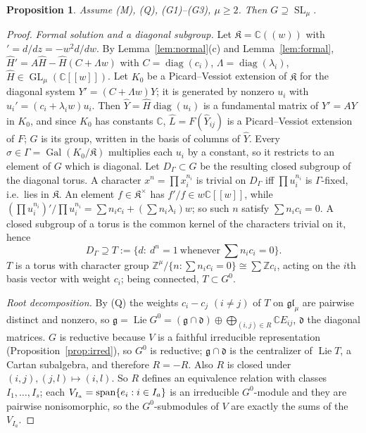 \documentclass[11pt]{article}
\numberwithin{equation}{section}
\newtheorem{proposition}[theorem]{Proposition}
\theoremstyle{definition}
\theoremstyle{remark}
\newcommand{\C}{\mathbb C}\newcommand{\Q}{\mathbb Q}\newcommand{\R}{\mathbb R}\newcommand{\Z}{\mathbb Z}
\newcommand{\SL}{\operatorname{SL}}\newcommand{\GL}{\operatorname{GL}}\newcommand{\PGL}{\operatorname{PGL}}
\newcommand{\Lie}{\operatorname{Lie}}\newcommand{\Gal}{\operatorname{Gal}}\newcommand{\wt}{\operatorname{wt}}
\begin{document}
\begin{proposition}\label{prop:SL}
Assume \textup{(M)}, \textup{(Q)}, \textup{(G1)--(G3)}, $\mu\ge2$. Then
$G\supseteq\SL_\mu$.
\end{proposition}
\begin{proof}
\emph{Formal solution and a diagonal subgroup.} Let $\mathfrak K=\C((w))$ with
$'=d/dz=-w^2d/dw$. By Lemma~\ref{lem:normal}(c) and Lemma~\ref{lem:formal},
$\widehat H'=A\widehat H-\widehat H(C+\Lambda w)$ with
$C=\operatorname{diag}(c_i)$, $\Lambda=\operatorname{diag}(\lambda_i)$,
$\widehat H\in\GL_\mu(\C[[w]])$. Let $K_0$ be a Picard--Vessiot extension of
$\mathfrak K$ for the diagonal system $Y'=(C+\Lambda w)Y$; it is generated by
nonzero $u_i$ with $u_i'=(c_i+\lambda_iw)u_i$. Then
$\widehat Y=\widehat H\operatorname{diag}(u_i)$ is a fundamental matrix of
$Y'=AY$ in $K_0$, and since $K_0$ has constants $\C$,
$\widehat L=F(\widehat Y_{ij})$ is a Picard--Vessiot extension of $F$; $G$ is its
group, written in the basis of columns of $\widehat Y$. Every
$\sigma\in\Gamma=\Gal(K_0/\mathfrak K)$ multiplies each $u_i$ by a constant, so
it restricts to an element of $G$ which is diagonal. Let $D_\Gamma\subset G$ be
the resulting closed subgroup of the diagonal torus. A character
$x^n=\prod x_i^{n_i}$ is trivial on $D_\Gamma$ iff $\prod u_i^{n_i}$ is
$\Gamma$-fixed, i.e.\ lies in $\mathfrak K$. An element $f\in\mathfrak K^\times$
has $f'/f\in w\C[[w]]$, while
$(\prod u_i^{n_i})'/\prod u_i^{n_i}=\sum n_ic_i+(\sum n_i\lambda_i)w$; so such
$n$ satisfy $\sum n_ic_i=0$. A closed subgroup of a torus is the common kernel
of the characters trivial on it, hence
\[
 D_\Gamma\supseteq T:=\{d:\ d^n=1\ \text{whenever}\ \textstyle\sum n_ic_i=0\}.
\]
$T$ is a torus with character group $\Z^\mu/\{n:\sum n_ic_i=0\}\cong\sum\Z c_i$,
acting on the $i$th basis vector with weight $c_i$; being connected,
$T\subset G^0$.

\emph{Root decomposition.} By (Q) the weights $c_i-c_j$ $(i\ne j)$ of $T$ on
$\mathfrak{gl}_\mu$ are pairwise distinct and nonzero, so
$\mathfrak g=\Lie G^0=(\mathfrak g\cap\mathfrak d)\oplus\bigoplus_{(i,j)\in R}\C E_{ij}$,
$\mathfrak d$ the diagonal matrices. $G$ is reductive because $V$ is a faithful
irreducible representation (Proposition~\ref{prop:irred}), so $G^0$ is
reductive; $\mathfrak g\cap\mathfrak d$ is the centralizer of $\Lie T$, a Cartan
subalgebra, and therefore $R=-R$. Also $R$ is closed under
$(i,j),(j,l)\mapsto(i,l)$. So $R$ defines an equivalence relation with classes
$I_1,\dots,I_s$; each $V_{I_a}=\operatorname{span}\{e_i:i\in I_a\}$ is an irreducible
$G^0$-module and they are pairwise nonisomorphic, so the $G^0$-submodules of
$V$ are exactly the sums of the $V_{I_a}$.


\end{proof}
\end{document}
